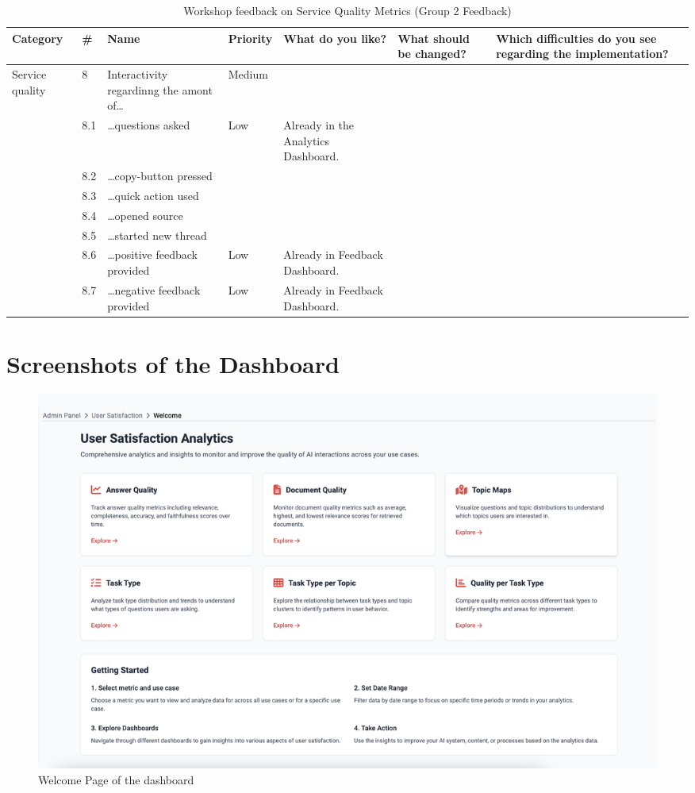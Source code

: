 \documentclass[
	english,
	ruledheaders=section,%
	class=report,%
	thesis={type=bachelor},%
	accentcolor=1b,%
	custommargins=true,%
	marginpar=false,%
	parskip=half-,%
	fontsize=11pt,%
	DIV=14,
]{tudapub}
\begin{document}
\begin{table}
    \centering
    \small 
    \caption{Workshop feedback on Service Quality Metrics (Group 2 Feedback)}
    \label{tab:service_quality_g2}
    \begin{tabularx}{\textheight}{p{2.2cm} l >{\RaggedRight\arraybackslash}X l >{\RaggedRight\arraybackslash}X >{\RaggedRight\arraybackslash}X >{\RaggedRight\arraybackslash}X}
        \toprule
        \textbf{Category} & \textbf{\#} & \textbf{Name} & \textbf{Priority} & \textbf{What do you like?} & \textbf{What should be changed?} & \textbf{Which difficulties do you see regarding the implementation?} \\
        \midrule

        \multirow{8}{=}{Service quality} 
        & 8 & Interactivity regardinng the amont of\dots & Medium & & & \\
        \cmidrule(l){2-7}
        & 8.1 & \dots questions asked & Low & Already in the Analytics Dashboard. & & \\
        \cmidrule(l){2-7}
        & 8.2 & \dots copy-button pressed & & & & \\
        \cmidrule(l){2-7}
        & 8.3 & \dots quick action used & & & & \\
        \cmidrule(l){2-7}
        & 8.4 & \dots opened source & & & & \\
        \cmidrule(l){2-7}
        & 8.5 & \dots started new thread & & & & \\
        \cmidrule(l){2-7}
        & 8.6 & \dots positive feedback provided & Low & Already in Feedback Dashboard. & & \\
        \cmidrule(l){2-7}
        & 8.7 & \dots negative feedback provided & Low & Already in Feedback Dashboard. & & \\
        \bottomrule
    \end{tabularx}
\end{table}

\clearpage %

\section*{Screenshots of the Dashboard}

\begin{figure}[h!]
    \centering
    \includegraphics[width=0.75\linewidth]{images/WelcomePage.png}
    \captionsetup{list=no}
    \caption{Welcome Page of the dashboard}
    \label{fig:welcome_page}
\end{figure}
\end{document}
